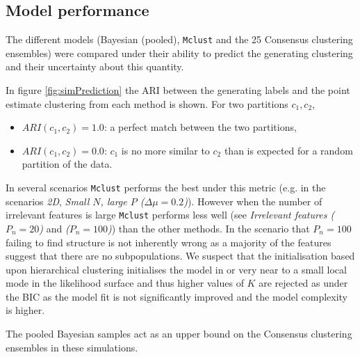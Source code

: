 \documentclass[]{article}
\begin{document}

\subsection{Model performance} \label{sec:simModelPerformance}
The different models (Bayesian (pooled), \texttt{Mclust} and the 25 Consensus clustering ensembles) were compared under their ability to predict the generating clustering and their uncertainty about this quantity.

In figure \ref{fig:simPrediction} the ARI between the generating labels and the point estimate clustering from each method is shown. For two partitions $c_1, c_2$, 
\begin{itemize}
	\item $ARI(c_1, c_2) = 1.0$: a perfect match between the two partitions,
	\item $ARI(c_1, c_2) = 0.0$: $c_1$ is no more similar to $c_2$ than is expected for a random partition of the data.
\end{itemize}
In several scenarios \texttt{Mclust} performs the best under this metric (e.g. in the scenarios \emph{2D}, \emph{Small $N$, large $P$ ($\Delta \mu = 0.2$)}). However when the number of irrelevant features is large \texttt{Mclust} performs less well (see \emph{Irrelevant features ($P_n = 20$)} and \emph{($P_n = 100$)}) than the other methods. In the scenario that $P_n = 100$ failing to find structure is not inherently wrong as a majority of the features suggest that there are no subpopulations. We suspect that the initialisation based upon hierarchical clustering initialises the model in or very near to a small local mode in the likelihood surface and thus higher values of $K$ are rejected as under the BIC as the model fit is not significantly improved and the model complexity is higher. 

The pooled Bayesian samples act as an upper bound on the Consensus clustering ensembles in these simulations.
\end{document}
